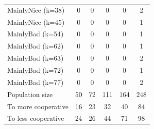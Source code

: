 \documentclass[journal,10pt,twoside]{IEEEtran}
\begin{document}
\begin{table}[ht]
\begin{tabular}{l|ccccc}
		MainlyNice (k=38) &   0 &   0 &    0 &    0 &    2 \\
		MainlyNice (k=45) &   0 &   0 &    0 &    0 &    1 \\
		MainlyBad (k=54)  &   0 &   0 &    0 &    0 &    1 \\
		MainlyBad (k=62)  &   0 &   0 &    0 &    0 &    1 \\
		MainlyBad (k=63)  &   0 &   0 &    0 &    0 &    2 \\
		MainlyBad (k=72)  &   0 &   0 &    0 &    0 &    1 \\
		MainlyBad (k=77)  &   0 &   0 &    0 &    0 &    2 \\ \midrule
		Population size     &  50 &  72 & 111 & 164 & 248 \\
		To more cooperative &  16 &  23 &  32 &  40 &  84 \\
		To less cooperative &  24 &  26 &  44 &  71 &  98 \\ \bottomrule
	\end{tabular}
\end{table}
\end{document}
